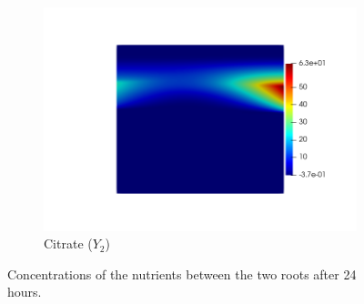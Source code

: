 \documentclass[11pt]{article}
\begin{document}
\begin{figure}[!htb]
\begin{subfigure}[t]{0.3\textwidth}
    \includegraphics[trim=100 100 70 100,width=\textwidth]{Figures/Y2.png}
    \caption{Citrate ($Y_2$)}
\end{subfigure}
\caption{Concentrations of the nutrients between the two roots after 24 hours.}
\end{figure}

\FloatBarrier
\end{document}
